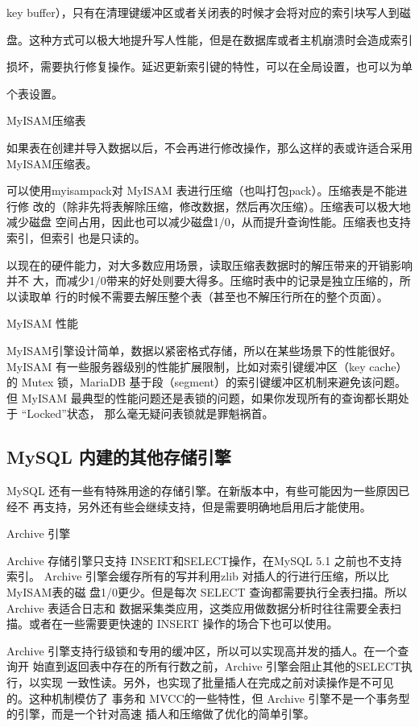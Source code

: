 key buffer），只有在清理键缓冲区或者关闭表的时候才会将对应的索引块写人到磁

盘。这种方式可以极大地提升写人性能，但是在数据库或者主机崩溃时会造成索引

损坏，需要执行修复操作。延迟更新索引键的特性，可以在全局设置，也可以为单

个表设置。

MyISAM压缩表

如果表在创建并导入数据以后，不会再进行修改操作，那么这样的表或许适合采用
MyISAM压缩表。

可以使用myisampack对 MyISAM 表进行压缩（也叫打包pack）。压缩表是不能进行修
改的（除非先将表解除压缩，修改数据，然后再次压缩）。压缩表可以极大地减少磁盘
空间占用，因此也可以减少磁盘1/0，从而提升查询性能。压缩表也支持索引，但索引
也是只读的。

以现在的硬件能力，对大多数应用场景，读取压缩表数据时的解压带来的开销影响并不
大，而减少1/0带来的好处则要大得多。压缩时表中的记录是独立压缩的，所以读取单
行的时候不需要去解压整个表（甚至也不解压行所在的整个页面）。

MyISAM 性能

MyISAM引擎设计简单，数据以紧密格式存储，所以在某些场景下的性能很好。
MyISAM 有一些服务器级别的性能扩展限制，比如对索引键缓冲区（key cache）的
Mutex 锁，MariaDB 基于段（segment）的索引键缓冲区机制来避免该问题。但 MyISAM
最典型的性能问题还是表锁的问题，如果你发现所有的查询都长期处于 “Locked”状态，
那么毫无疑问表锁就是罪魁祸首。

\subsection{MySQL 内建的其他存储引擎}
MySQL 还有一些有特殊用途的存储引擎。在新版本中，有些可能因为一些原因已经不
再支持，另外还有些会继续支持，但是需要明确地启用后才能使用。

Archive 引擎

Archive 存储引擎只支持 INSERT和SELECT操作，在MySQL 5.1 之前也不支持索引。
Archive 引擎会缓存所有的写并利用zlib 对插人的行进行压缩，所以比 MyISAM表的磁
盘1/0更少。但是每次 SELECT 查询都需要执行全表扫描。所以 Archive 表适合日志和
数据采集类应用，这类应用做数据分析时往往需要全表扫描。或者在一些需要更快速的
INSERT 操作的场合下也可以使用。

Archive 引擎支持行级锁和专用的缓冲区，所以可以实现高并发的插人。在一个查询开
始直到返回表中存在的所有行数之前，Archive 引擎会阻止其他的SELECT执行，以实现
一致性读。另外，也实现了批量插人在完成之前对读操作是不可见的。这种机制模仿了
事务和 MVCC的一些特性，但 Archive 引擎不是一个事务型的引擎，而是一个针对高速
插人和压缩做了优化的简单引擎。

